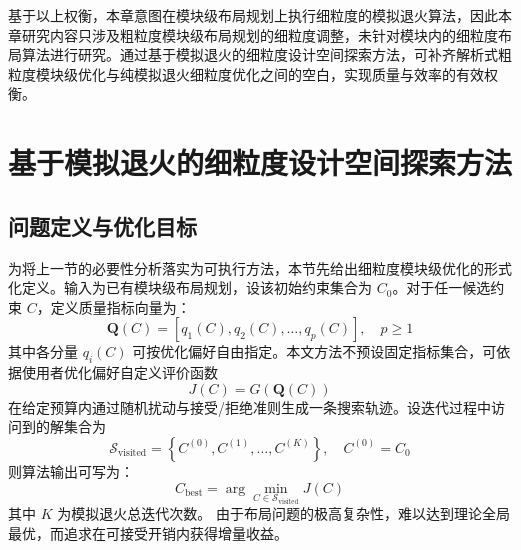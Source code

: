 基于以上权衡，本章意图在模块级布局规划上执行细粒度的模拟退火算法，因此本章研究内容只涉及粗粒度模块级布局规划的细粒度调整，未针对模块内的细粒度布局算法进行研究。通过基于模拟退火的细粒度设计空间探索方法，可补齐解析式粗粒度模块级优化与纯模拟退火细粒度优化之间的空白，实现质量与效率的有效权衡。




\section{基于模拟退火的细粒度设计空间探索方法}
\label{sec:chap4-sa-method}

\subsection{问题定义与优化目标}
\label{sec:chap4-problem-definition}

为将上一节的必要性分析落实为可执行方法，本节先给出细粒度模块级优化的形式化定义。输入为已有模块级布局规划，设该初始约束集合为 $C_0$。对于任一候选约束 $C$，定义质量指标向量为：
\begin{equation}
\label{eq:chap4-quality-vector}
\mathbf{Q}(C)=\left[q_1(C),q_2(C),\ldots,q_p(C)\right],\quad p\ge 1
\end{equation}
其中各分量 $q_i(C)$ 可按优化偏好自由指定。本文方法不预设固定指标集合，可依据使用者优化偏好自定义评价函数
\begin{equation}
J(C)=G\!\left(\mathbf{Q}(C)\right)
\end{equation}
在给定预算内通过随机扰动与接受/拒绝准则生成一条搜索轨迹。设迭代过程中访问到的解集合为
\begin{equation}
\mathcal{S}_{\mathrm{visited}}=\left\{C^{(0)},C^{(1)},\ldots,C^{(K)}\right\},\quad C^{(0)}=C_0
\end{equation}
则算法输出可写为：
\begin{equation}
\label{eq:chap4-optimization-target}
C_{\mathrm{best}}=\arg\min_{C\in \mathcal{S}_{\mathrm{visited}}} J(C)
\end{equation}
其中 $K$ 为模拟退火总迭代次数。
由于布局问题的极高复杂性，难以达到理论全局最优，而追求在可接受开销内获得增量收益。


